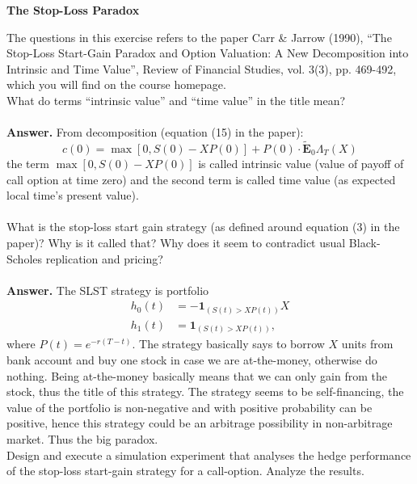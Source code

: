 \documentclass[a4paper]{article}
\begin{document}
\setlength\parindent{0pt}

{\Large{\textbf{The Stop-Loss Paradox}}}\\
\vspace{0.2cm}

The questions in this exercise refers to the paper Carr \& Jarrow (1990), ``The Stop-Loss Start-Gain Paradox and Option Valuation: A New Decomposition into Intrinsic and Time Value'', Review of Financial Studies, vol. 3(3), pp. 469-492, which you will find on the course homepage. \\

What do terms ``intrinsic value'' and ``time value'' in the title mean? \\
\\
\textbf{Answer.} From decomposition (equation (15) in the paper):
$$
c(0)=\max[0,S(0)-XP(0)]+P(0)\cdot \tilde{\mathbf{E}}_0\Lambda_T(X)
$$
the term $\max[0,S(0)-XP(0)]$ is called intrinsic value (value of payoff of call option at time zero) and the second term is called time value (as expected local time's present value).\\
\\

What is the stop-loss start gain strategy (as defined around equation (3) in the paper)? Why is it called that? Why does it seem to contradict usual Black-Scholes replication and pricing?\\
\\
\textbf{Answer.} The SLST strategy is portfolio
\begin{align*}
h_0(t) &= -\textbf{1}_{(S(t)>XP(t))}X\\
h_1(t) &= \textbf{1}_{(S(t)>XP(t))},
\end{align*}
where $P(t)=e^{-r(T-t)}.$ The strategy basically says to borrow $X$ units from bank account and buy one stock in case we are at-the-money, otherwise do nothing. Being at-the-money basically means that we can only gain from the stock, thus the title of this strategy. The strategy seems to be self-financing, the value of the portfolio is non-negative and with positive probability can be positive, hence this strategy could be an arbitrage possibility in non-arbitrage market. Thus the big paradox.\\

\vspace{0.2cm}
Design and execute a simulation experiment that analyses the hedge performance of the stop-loss start-gain strategy for a call-option. Analyze the results. \\
\end{document}
